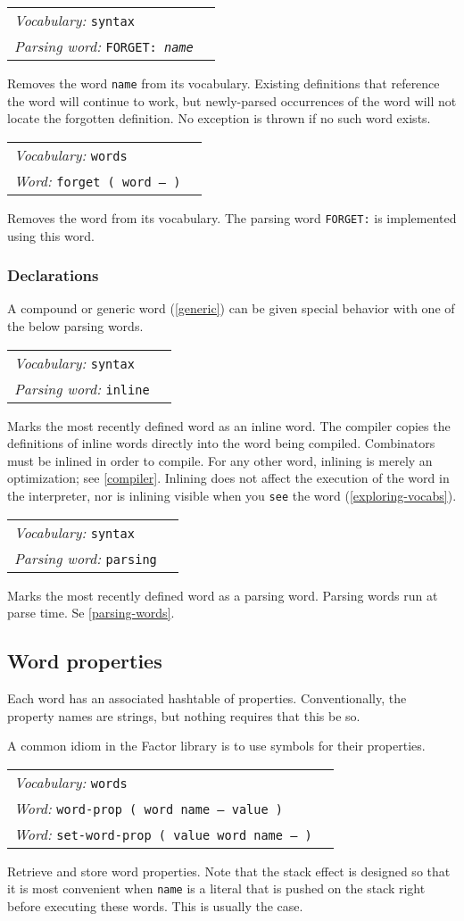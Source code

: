 \documentclass{book}
\newcommand{\vocabulary}[1]{\emph{Vocabulary:} \texttt{#1}&\\}
\newcommand{\parsingword}[2]{\index{\texttt{#1}}\emph{Parsing word:} \texttt{#2}&\\}
\newcommand{\ordinaryword}[2]{\index{\texttt{#1}}\emph{Word:} \texttt{#2}&\\}
\newcommand{\wordtable}[1]{


\begin{tabularx}{12cm}{lX}
\hline
#1
\hline
\end{tabularx}

}
\begin{document}
\wordtable{
\vocabulary{syntax}
\parsingword{FORGET:}{FORGET:~\emph{name}}
}
Removes the word \texttt{name} from its vocabulary. Existing definitions that reference the word will continue to work, but newly-parsed occurrences of the word will not locate the forgotten definition. No exception is thrown if no such word exists.
\wordtable{
\vocabulary{words}
\ordinaryword{forget}{forget ( word -- )}

}
Removes the word from its vocabulary. The parsing word \texttt{FORGET:} is implemented using this word.

\subsubsection{Declarations}\label{declarations}

A compound or generic word (\ref{generic}) can be given special behavior with one of the below parsing words.

\wordtable{
\vocabulary{syntax}
\parsingword{inline}{inline}
}
Marks the most recently defined word as an inline word. The compiler copies the definitions of inline words directly into the word being compiled. Combinators must be inlined in order to compile. For any other word, inlining is merely an optimization; see \ref{compiler}. Inlining does not affect the execution of the word in the interpreter, nor is inlining visible when you \texttt{see} the word (\ref{exploring-vocabs}).

\wordtable{
\vocabulary{syntax}
\parsingword{parsing}{parsing}
}
Marks the most recently defined word as a parsing word. Parsing words run at parse time. Se \ref{parsing-words}.

\subsection{Word properties}\label{word-props}


Each word has an associated hashtable of properties. Conventionally, the property names are strings, but nothing requires that this be so.

A common idiom in the Factor library is to use symbols for their properties. 

\wordtable{
\vocabulary{words}
\ordinaryword{word-prop}{word-prop ( word name -- value )}
\ordinaryword{set-word-prop}{set-word-prop ( value word name -- )}

}
Retrieve and store word properties. Note that the stack effect is designed so that it is most convenient when \texttt{name} is a literal that is pushed on the stack right before executing these words. This is usually the case.
\end{document}
